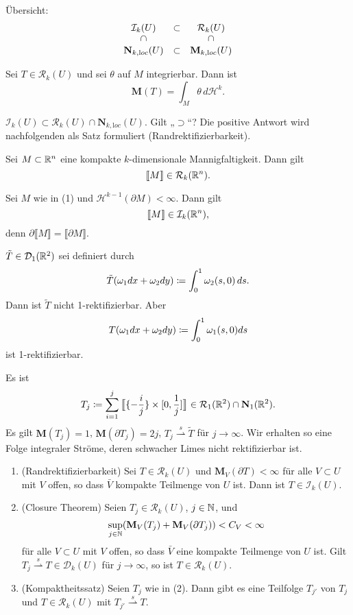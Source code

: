 \documentclass[a4paper,twoside,DIV15,BCOR12mm]{scrbook}
\newcommand{\HM}{\mathscr H}
\newcommand{\MN}{\mathbf M}
\newcommand{\NS}{\mathbf N}
\newcommand{\loc}{\mathrm loc}
\begin{document}
\begin{bemerkungen}
\item  Übersicht:
\[
\begin{array}[c]{ccc}
\mathcal I_k(U) & \subset & \mathcal R_k(U) \\
\rotatebox{90}{$\supset$}  & & \rotatebox{90}{$\supset$} \\
\NS_{k,\loc}(U) & \subset & \MN_{k,\loc}(U)
\end{array}
\]
\item Sei $T\in\mathcal R_k(U)$ und sei $\theta$ auf $M$ integrierbar. Dann ist
\[
\MN(T) = \int_M \theta \, d\HM^k.
\]
\item $\mathcal I_k(U) \subset \mathcal R_k(U) \cap \NS_{k,\loc}(U)$. Gilt „$\supset$“? 
Die positive Antwort wird nachfolgenden als Satz formuliert (Randrektifizierbarkeit).
\end{bemerkungen}

\begin{beispiele}
\item Sei $M\subset \mathbb{R}^n$ eine kompakte $k$-dimensionale Mannigfaltigkeit. Dann gilt
\[
\llbracket M \rrbracket \in \mathcal R_k(\mathbb{R}^n).
\]
\item Sei $M$ wie in (1) und $\HM^{k-1}(\partial M) < \infty$. Dann gilt
\[
\llbracket M \rrbracket \in \mathcal I_k(\mathbb{R}^n),
\]
denn $\partial \llbracket M \rrbracket = \llbracket \partial M \rrbracket$.
\item $\tilde T\in\mathcal D_1(\mathbb{R}^2)$ sei definiert durch
\[
\tilde T (\omega_1 dx + \omega_2 dy) \da \int_0^1 \omega_2 (s,0) \, ds.
\]
Dann ist $\tilde T$ nicht 1-rektifizierbar. Aber
\[
T(\omega_1 dx + \omega_2 dy) \da \int_0^1 \omega_1(s,0) ds
\]
ist 1-rektifizierbar.
\item Es ist
\[
T_j \da \sum_{i=1}^j \big\llbracket \{- \frac ij\} \times [0,\frac 1j] \big\rrbracket \in \mathcal R_1(\MdR^2) \cap \NS_1(\MdR^2).
\]
Es gilt $\MN(T_j) = 1$, $\MN(\partial T_j) = 2j$, $T_j\stackrel s \rightharpoonup \tilde T$ für $j\to \infty$. Wir erhalten so eine Folge integraler Ströme, deren schwacher Limes nicht rektifizierbar ist.
\end{beispiele}

\begin{satz}
\begin{enumerate}
\item (Randrektifizierbarkeit)  Sei $T\in\mathcal R_k(U)$ und $\MN_V(\partial T)<\infty$ für alle $V\subset U$ mit $V$ offen, so dass $\bar V$ kompakte Teilmenge von $U$ ist. Dann ist $T\in \mathcal I_k(U)$.
\item (Closure Theorem) Seien $T_j\in\mathcal R_k(U)$, $j\in\mathbb{N}$, und
$$\sup_{j\in\MdN}(\MN_V(T_j) + \MN_V(\partial T_j)) < C_V < \infty$$
für alle $V\subset U$ mit $V$ offen, so dass $\bar V$ eine kompakte Teilmenge von $U$ ist. Gilt $T_j \stackrel s \rightharpoonup T\in\mathcal D_k(U)$ für $j\to\infty$, so ist $T\in\mathcal R_k(U)$.
\item (Kompaktheitssatz) Seien $T_j$ wie in (2). Dann gibt es eine Teilfolge $T_{j'}$ von $T_j$ und $T\in\mathcal R_k(U)$ mit $T_{j'} \stackrel s\rightharpoonup T$.
\end{enumerate}
\end{satz}
\end{document}
